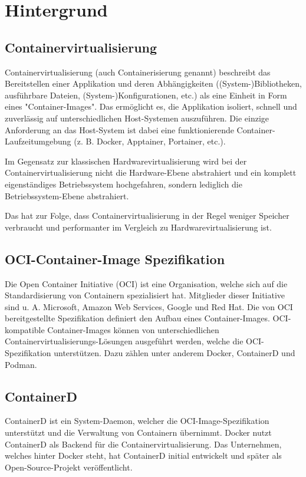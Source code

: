 \chapter{Hintergrund} \label{cha:background}

\section{Containervirtualisierung}

Containervirtualisierung (auch Containerisierung genannt) beschreibt das Bereitstellen einer Applikation und deren Abhängigkeiten ((System-)Bibliotheken, ausführbare Dateien, (System-)Konfigurationen, etc.) als eine Einheit in Form eines "Container-Images". Das ermöglicht es, die Applikation isoliert, schnell und zuverlässig auf unterschiedlichen Host-Systemen auszuführen. Die einzige Anforderung an das Host-System ist dabei eine funktionierende Container-Laufzeitumgebung (z. B. Docker, Apptainer, Portainer, etc.).

Im Gegensatz zur klassischen Hardwarevirtualisierung wird bei der Containervirtualisierung nicht die Hardware-Ebene abstrahiert und ein komplett eigenständiges Betriebssystem hochgefahren, sondern lediglich die Betriebssystem-Ebene abstrahiert.

Das hat zur Folge, dass Containervirtualisierung in der Regel weniger Speicher verbraucht und performanter im Vergleich zu Hardwarevirtualisierung ist. 

\section{OCI-Container-Image Spezifikation}

Die Open Container Initiative (OCI) ist eine Organisation, welche sich auf die Standardisierung von Containern spezialisiert hat. Mitglieder dieser Initiative sind u. A. Microsoft, Amazon Web Services, Google und Red Hat. Die von OCI bereitgestellte Spezifikation definiert den Aufbau eines Container-Images. OCI-kompatible Container-Images können von unterschiedlichen Containervirtualisierungs-Lösungen ausgeführt werden, welche die OCI-Spezifikation unterstützen. Dazu zählen unter anderem Docker, ContainerD und Podman.

\section{ContainerD}

ContainerD ist ein System-Daemon, welcher die OCI-Image-Spezifikation unterstützt und die Verwaltung von Containern übernimmt. Docker nutzt ContainerD als Backend für die Containervirtualisierung. Das Unternehmen, welches hinter Docker steht, hat ContainerD initial entwickelt und später als Open-Source-Projekt veröffentlicht.


